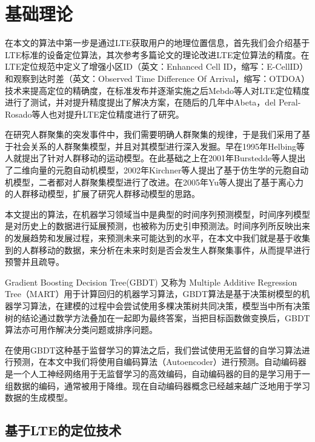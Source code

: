 \chapter{基础理论}
\label{chap:theory}

在本文的算法中第一步是通过LTE获取用户的地理位置信息，首先我们会介绍基于LTE标准的设备定位算法，其次参考多篇论文的理论改进LTE定位算法的精度。在LTE定位规范中定义了增强小区ID（英文：Enhanced Cell ID，缩写：E-CellID）\cite{ecellidwiki}和观察到达时差（英文：Observed Time Difference Of Arrival，缩写：OTDOA）\cite{otdoawiki}技术来提高定位的精确度，在标准发布并逐渐实施之后Mebdo等人对LTE定位精度进行了测试，并对提升精度提出了解决方案\cite{medbo2009propagation}，在随后的几年中Abeta\cite{abeta2010toward}，del Peral-Rosado\cite{del2012achievable}等人也对提升LTE定位精度进行了研究。

在研究人群聚集的突发事件中，我们需要明确人群聚集的规律，于是我们采用了基于社会关系的人群聚集模型，并且对其模型进行深入发掘。早在1995年Helbing等人就提出了针对人群移动的运动模型\cite{helbing1995social}。在此基础之上在2001年Burstedde等人\cite{burstedde2001simulation}提出了二维向量的元胞自动机模型，2002年Kirchner等人\cite{kirchner2002simulation}提出了基于仿生学的元胞自动机模型，二者都对人群聚集模型进行了改进。在2005年Yu等人\cite{yu2005centrifugal}提出了基于离心力的人群移动模型，扩展了研究人群移动模型的思路。

本文提出的算法，在机器学习领域当中是典型的时间序列预测模型，时间序列模型是对历史上的数据进行延展预测，也被称为历史引申预测法。时间序列所反映出来的发展趋势和发展过程，来预测未来可能达到的水平，在本文中我们就是基于收集到的人群移动的数据，来分析在未来时刻是否会发生人群聚集事件，从而提早进行预警并且疏导。

Gradient Boosting Decision Tree(GBDT) \cite{friedman2001greedy}又称为 Multiple Additive Regression Tree（MART）用于计算回归的机器学习算法，GBDT算法是基于决策树模型的机器学习算法，在建模的过程中会尝试使用多棵决策树共同决策，模型当中所有决策树的结论通过数学方法叠加在一起即为最终答案，当把目标函数做变换后，GBDT算法亦可用作解决分类问题或排序问题。

在使用GBDT这种基于监督学习的算法之后，我们尝试使用无监督的自学习算法进行预测，在本文中我们将使用自编码算法（Autoencoder）\cite{bengio2009learning}进行预测。自动编码器是一个人工神经网络用于无监督学习的高效编码\cite{liou2008modeling}\cite{liou2014autoencoder}，自动编码器的目的是学习用于一组数据的编码，通常被用于降维。现在自动编码器概念已经越来越广泛地用于学习数据的生成模型\cite{kingma2013auto}。

\section{基于LTE的定位技术}

